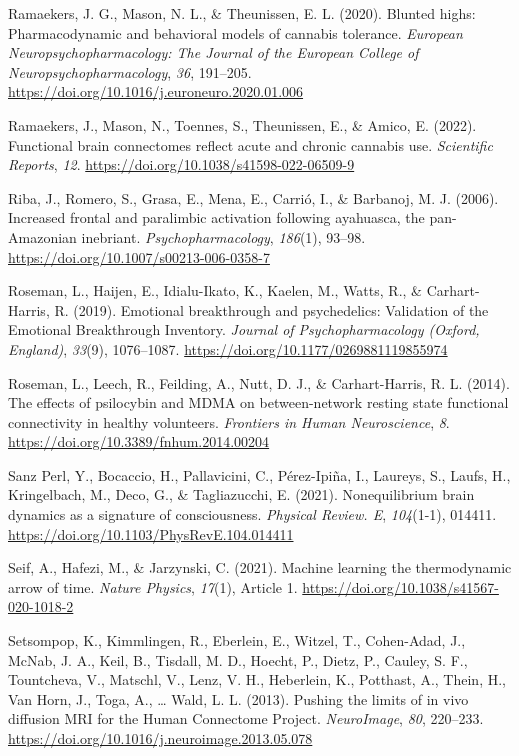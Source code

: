 \begin{CSLReferences}{1}{0}
Ramaekers, J. G., Mason, N. L., \& Theunissen, E. L. (2020). Blunted
highs: Pharmacodynamic and behavioral models of cannabis tolerance.
\emph{European Neuropsychopharmacology: The Journal of the European
College of Neuropsychopharmacology}, \emph{36}, 191--205.
\url{https://doi.org/10.1016/j.euroneuro.2020.01.006}

Ramaekers, J., Mason, N., Toennes, S., Theunissen, E., \& Amico, E.
(2022). Functional brain connectomes reflect acute and chronic cannabis
use. \emph{Scientific Reports}, \emph{12}.
\url{https://doi.org/10.1038/s41598-022-06509-9}

Riba, J., Romero, S., Grasa, E., Mena, E., Carrió, I., \& Barbanoj, M.
J. (2006). Increased frontal and paralimbic activation following
ayahuasca, the pan-Amazonian inebriant. \emph{Psychopharmacology},
\emph{186}(1), 93--98. \url{https://doi.org/10.1007/s00213-006-0358-7}

Roseman, L., Haijen, E., Idialu-Ikato, K., Kaelen, M., Watts, R., \&
Carhart-Harris, R. (2019). Emotional breakthrough and psychedelics:
Validation of the Emotional Breakthrough Inventory. \emph{Journal of
Psychopharmacology (Oxford, England)}, \emph{33}(9), 1076--1087.
\url{https://doi.org/10.1177/0269881119855974}

Roseman, L., Leech, R., Feilding, A., Nutt, D. J., \& Carhart-Harris, R.
L. (2014). The effects of psilocybin and MDMA on between-network resting
state functional connectivity in healthy volunteers. \emph{Frontiers in
Human Neuroscience}, \emph{8}.
\url{https://doi.org/10.3389/fnhum.2014.00204}

Sanz Perl, Y., Bocaccio, H., Pallavicini, C., Pérez-Ipiña, I., Laureys,
S., Laufs, H., Kringelbach, M., Deco, G., \& Tagliazucchi, E. (2021).
Nonequilibrium brain dynamics as a signature of consciousness.
\emph{Physical Review. E}, \emph{104}(1-1), 014411.
\url{https://doi.org/10.1103/PhysRevE.104.014411}

Seif, A., Hafezi, M., \& Jarzynski, C. (2021). Machine learning the
thermodynamic arrow of time. \emph{Nature Physics}, \emph{17}(1),
Article 1. \url{https://doi.org/10.1038/s41567-020-1018-2}

Setsompop, K., Kimmlingen, R., Eberlein, E., Witzel, T., Cohen-Adad, J.,
McNab, J. A., Keil, B., Tisdall, M. D., Hoecht, P., Dietz, P., Cauley,
S. F., Tountcheva, V., Matschl, V., Lenz, V. H., Heberlein, K.,
Potthast, A., Thein, H., Van Horn, J., Toga, A., \ldots{} Wald, L. L.
(2013). Pushing the limits of in vivo diffusion MRI for the Human
Connectome Project. \emph{NeuroImage}, \emph{80}, 220--233.
\url{https://doi.org/10.1016/j.neuroimage.2013.05.078}


\end{CSLReferences}
